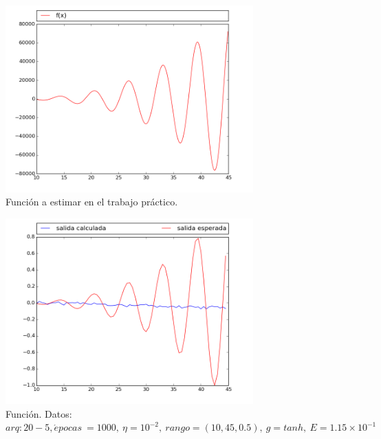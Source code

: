 \documentclass[12pt,a4paper]{article}
\begin{document}
\begin{figure}[H]
\centering
\includegraphics[width=0.85\textwidth]{img/fx.png}
\caption{\label{fig:fx} Función a estimar en el trabajo práctico.}
\end{figure}

\begin{figure}[H]
\centering
\includegraphics[width=0.85\textwidth]{img/_20__5_-eta_0_01-FUNCTION.png}
\caption{\label{fig:test1} Función. Datos:  $arq: 20-5, \acute{e} pocas \ = 1000,\ \eta = 10^{-2}, \ rango=(10, 45, 0.5),\ g=tanh, \ E = 1.15 \times 10^{-1}$}
\end{figure}
\end{document}
